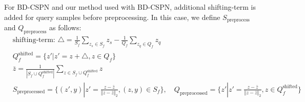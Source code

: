 \documentclass{article}
\begin{document}
For BD-CSPN \cite{BDCSPN} and our method used with BD-CSPN, additional shifting-term is added for query samples before preprocessing.
In this case, we define $S_\text{preprocess}$ and $Q_\text{preprocess}$ as follows:
\begin{align}
& \text{shifting-term: } \triangle = \frac{1}{S_f}\sum_{z_s\in S_f} z_s  - \frac{1}{Q_f}\sum_{z_q\in Q_f}z_q \\
& Q_f^\text{shifted} = \Big\{z'|z'=z + \triangle, z\in Q_f \Big\} \\
&\bar{z} = \frac{1}{|S_f\cup Q_f^\text{shifted}|} \sum_{z\in S_f\cup Q_f^\text{shifted}} z \\
&S_\text{preprocessed} = \Big\{(z', y)|z'=\frac{z-\bar{z}}{{\Vert z-\bar{z} \Vert}_2}, (z, y)\in S_f\Big\}, \quad Q_\text{preprocessed} = \Big\{z'|z'=\frac{z-\bar{z}}{{\Vert z-\bar{z} \Vert}_2}, z\in Q_f^\text{shifted}\Big\}
\end{align}

\newpage
\end{document}
